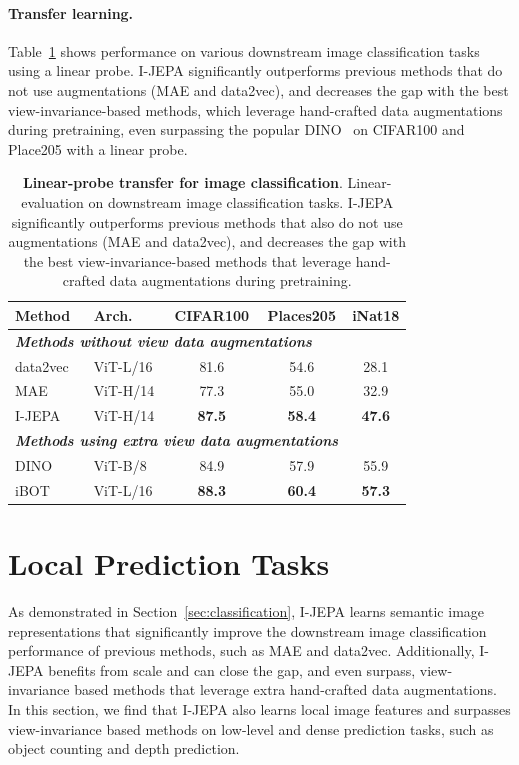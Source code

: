 \documentclass[10pt,twocolumn,letterpaper]{article}
\newcommand{\cc}{\cellcolor{fbApp}}
\newcommand{\putalg}{{I-JEPA}\xspace}
\begin{document}
\paragraph{Transfer learning.}
Table~\ref{tb:transfer-classification} shows performance on various downstream image classification tasks using a linear probe.
\putalg significantly outperforms previous methods that do not use augmentations (MAE and data2vec), and decreases the gap with the best view-invariance-based methods, which leverage hand-crafted data augmentations during pretraining, even surpassing the popular DINO~\cite{caron2021emerging} on CIFAR100 and Place205 with a linear probe.
\begin{table}[t]
    \centering
    \begin{tabular}{l l c c c}
        \bf\small Method & \bf\small Arch. & \bf\small CIFAR100 & \bf\small Places205 &  \bf\small iNat18 \\
        \toprule
        \multicolumn{5}{l}{\small\bf\it Methods without view data augmentations}\\
        \small data2vec~\cite{baevski2022data2vec} & \small ViT-L/16 & 81.6 & 54.6 & 28.1 \\
        \small MAE~\cite{he2021masked} & \small ViT-H/14 & 77.3 & 55.0 & 32.9 \\
        \small \putalg & \cc\small ViT-H/14 & \cc\bf 87.5 & \cc\bf 58.4 & \cc\bf 47.6 \\
        \midrule
        \multicolumn{4}{l}{\small\bf\it Methods using extra view data augmentations}\\
        \small DINO~\cite{caron2021emerging} & \small ViT-B/8 & 84.9 & 57.9 & 55.9 \\
        \small iBOT~\cite{zhou2021ibotyes} & \small ViT-L/16 & \bf 88.3 & \bf 60.4 & \bf 57.3
    \end{tabular}
    \caption{\textbf{Linear-probe transfer for image classification}. Linear-evaluation on downstream image classification tasks. \putalg significantly outperforms previous methods that also do not use augmentations (MAE and data2vec), and decreases the gap with the best view-invariance-based methods that leverage hand-crafted data augmentations during pretraining.}
    \label{tb:transfer-classification}
\end{table}

\section{Local Prediction Tasks}
\label{sec:local_prediction}
As demonstrated in Section~\ref{sec:classification}, \putalg learns semantic image representations that significantly improve the downstream image classification performance of previous methods, such as MAE and data2vec. Additionally, \putalg benefits from scale and can close the gap, and even surpass, view-invariance based methods that leverage extra hand-crafted data augmentations.
In this section, we find that \putalg also learns local image features and surpasses view-invariance based methods on low-level and dense prediction tasks, such as object counting and depth prediction.
\end{document}
